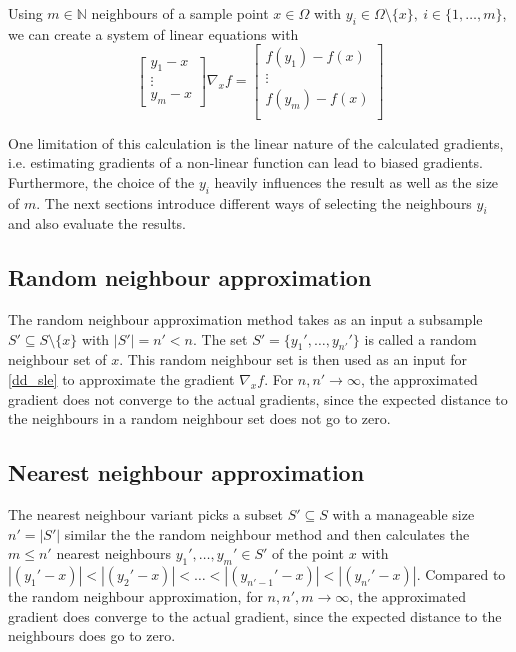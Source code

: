\documentclass[
  a4paper,  %
  twoside,  %
  bibliography=totoc,
  headsepline,
  cleardoublepage=empty,
  parskip=half,
  draft=false
]{scrbook}
\begin{document}
Using $m \in \mathds{N}$ neighbours of a sample point $x \in \Omega$ with $y_i \in \Omega \setminus \{x\}, ~ i \in \{1, \dots, m\}$, we can create a system of linear equations with
\begin{equation}
\begin{bmatrix}
    y_1 - x\\
    \vdots \\
    y_m - x
  \end{bmatrix}  \nabla_x f =\begin{bmatrix}
    f(y_1) - f(x) \\ \vdots \\  f(y_m) - f(x)
    \\
  \end{bmatrix}
  \label{dd_sle}
\end{equation}

One limitation of this calculation is the linear nature of the calculated gradients, i.e. estimating gradients of a non-linear function can lead to biased gradients.
Furthermore, the choice of the $y_i$ heavily influences the result as well as the size of $m$.
The next sections introduce different ways of selecting the neighbours $y_i$ and also evaluate the results.

\subsection{Random neighbour approximation}

The random neighbour approximation method takes as an input a subsample $S' \subseteq S \setminus \{x\}$ with $|S'|=n' < n$.
The set $S'=\{y_1', \dots, y_{n'}'\}$ is called a random neighbour set of $x$.
This random neighbour set is then used as an input for \ref{dd_sle} to approximate the gradient $\nabla_x f$.
For $n,n' \to \infty$, the approximated gradient does not converge to the actual gradients, since the expected distance to the neighbours in a random neighbour set does not go to zero.

\subsection{Nearest neighbour approximation}

The nearest neighbour variant picks a subset $S' \subseteq S$ with a manageable size $n'=|S'|$ similar the the random neighbour method and then calculates the $m \leq n'$ nearest neighbours $y_1',\dots,y_m' \in S'$ of the point $x$ with $|(y_1'-x)| < |(y_2'-x)|< \dots<|(y_{n'-1}'-x)| < |(y_{n'}'-x)|$.
Compared to the random neighbour approximation, for $n,n',m \to \infty$, the approximated gradient does converge to the actual gradient, since the expected distance to the neighbours does go to zero.
\end{document}
